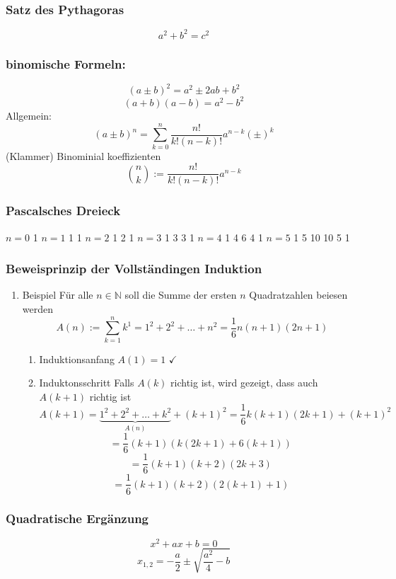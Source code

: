 \documentclass[11pt]{article}
\begin{document}
\subsubsection{Satz des Pythagoras}
\label{sec-2-2-2}
\[a^2 + b^2 = c^2\]
\subsubsection{binomische Formeln:}
\label{sec-2-2-3}
\[(a\pm b)^2 = a^2 \pm 2 a b + b^2\]
\[(a+b)(a-b) = a^2 - b^2\]
Allgemein:
\[(a \pm b)^n = \sum_{k=0}^n{\frac{n!}{k!(n-k)!}a^{n-k}(\pm)^k}\] (Klammer) Binominial koeffizienten
\[\binom{n}{k} := \frac{n!}{k!(n-k)!}a^{n-k}\]

\subsubsection{Pascalsches Dreieck}
\label{sec-2-2-4}
\begin{center}
$n = 0$ 1
$n = 1$ 1 1
$n = 2$ 1 2 1
$n = 3$ 1 3 3 1
$n = 4$ 1 4 6 4 1
$n = 5$ 1 5 10 10 5 1
\end{center}

\subsubsection{Beweisprinzip der Vollständingen Induktion}
\label{sec-2-2-5}
\begin{enumerate}
\item Beispiel
\label{sec-2-2-5-1}
Für alle $n \in \mathbb{N}$ soll die Summe der ersten $n$ Quadratzahlen beiesen werden
\[A(n) := \sum_{k=1}^n{k^1} = 1^2 + 2^2 + \ldots + n^2 = \frac{1}{6}n(n+1)(2n+1)\]
\begin{enumerate}
\item Induktionsanfang $A(1) = 1$ $\checkmark$
\item Induktonsschritt Falls $A(k)$ richtig ist, wird gezeigt, dass auch $A(k+1)$ richtig ist
\[A(k+1) = \underbrace{1^2 + 2^2 + \ldots + k^2}_{A(n)} + (k+1)^2 = \frac{1}{6}k(k+1)(2k+1)+(k+1)^2\]
\[=\frac{1}{6}(k+1)(k(2k+1)+6(k+1))\]
\[=\frac{1}{6}(k+1)(k+2)(2k+3)\]
\[=\frac{1}{6}(k+1)(k+2)(2(k+1)+1)\]
\end{enumerate}
\end{enumerate}

\subsubsection{Quadratische Ergänzung}
\label{sec-2-2-6}
\[x^2 + a x + b = 0\]
\[x_{1,2}=-\frac{a}{2}\pm \sqrt{\frac{a^2}{4}-b}\]
\end{document}
